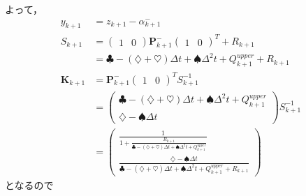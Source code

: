 よって，
\begin{align}
  y_{k+1} &= z_{k+1} - \alpha_{k+1}^{-}\\
  S_{k+1} &=
  \begin{pmatrix}
    1 & 0
  \end{pmatrix}
  \boldsymbol{P}_{k+1}^{-}
  \begin{pmatrix}
    1 & 0
  \end{pmatrix}^{T} + R_{k+1}\\
  &=
  \clubsuit - (\diamondsuit + \heartsuit) \Delta t + \spadesuit \Delta^2 t + Q^{upper}_{k+1} + R_{k+1}\\
  \boldsymbol{K}_{k+1} &=
  \boldsymbol{P}_{k+1}^{-}
  \begin{pmatrix}
    1 & 0
  \end{pmatrix}^{T}
  S_{k+1}^{-1}\\
  &=
  \begin{pmatrix}
    \clubsuit - (\diamondsuit + \heartsuit) \Delta t + \spadesuit \Delta^2 t + Q^{upper}_{k+1}\\
    \diamondsuit - \spadesuit \Delta t
  \end{pmatrix}
  S_{k+1}^{-1}\\
  &=
  \begin{pmatrix}
    \frac{1}{1 + \frac{R_{k+1}}{\clubsuit - (\diamondsuit + \heartsuit) \Delta t + \spadesuit \Delta^2 t + Q^{upper}_{k+1}}}\\
    \frac{\diamondsuit - \spadesuit \Delta t}{\clubsuit - (\diamondsuit + \heartsuit) \Delta t + \spadesuit \Delta^2 t + Q^{upper}_{k+1} + R_{k+1}}
  \end{pmatrix}
\end{align}
となるので
